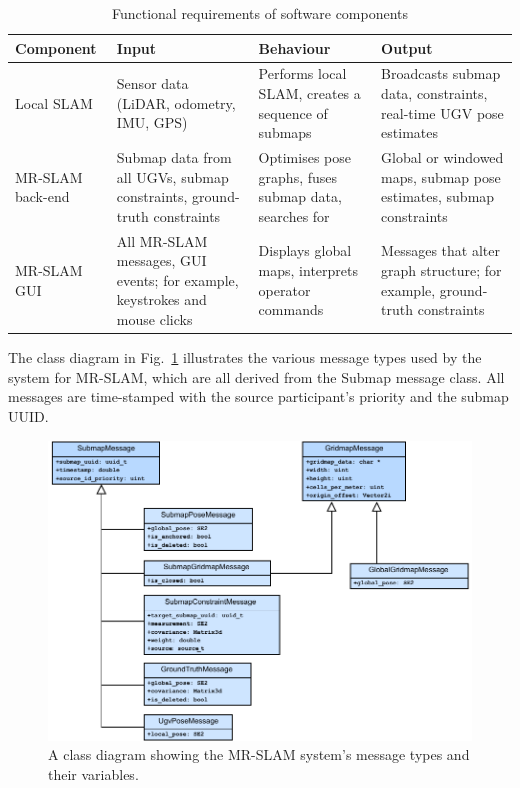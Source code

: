 \begin{table}[H]
	\caption{Functional requirements of software components}
	\centering
	\label{tbl4:fr}
	\begin{tabularx}{\textwidth}{ p{2cm} X  X X }
		\toprule
		Component        & Input                                                                      & Behaviour                                              & Output                                                                     \\ \midrule
		Local SLAM       & Sensor data (LiDAR, odometry, IMU, GPS)                                    & Performs local SLAM, creates a sequence of submaps     & Broadcasts submap data, constraints, real-time UGV pose estimates          \\
		MR-SLAM back-end & Submap data from all UGVs, submap constraints, ground-truth constraints    & Optimises pose graphs, fuses submap data, searches for & Global or windowed maps, submap pose estimates, submap constraints         \\
		MR-SLAM GUI      & All MR-SLAM messages, GUI events; for example, keystrokes and mouse clicks & Displays global maps, interprets operator commands     & Messages that alter graph structure; for example, ground-truth constraints \\ \bottomrule
	\end{tabularx}
\end{table}

The class diagram in Fig.~\ref{fig:4:cd} illustrates the various message types used by the system for MR-SLAM, which are all derived from the Submap message class. All messages are time-stamped with the source participant's priority and the submap UUID.

\begin{figure}[H]
	\centering
	\includegraphics[width=0.9\linewidth]{fig3}
	\caption[MR-SLAM class diagram]{A class diagram showing the MR-SLAM system’s message types and their variables.}
	\label{fig:4:cd}
\end{figure}

